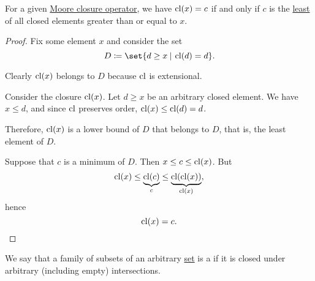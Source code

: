 \begin{proposition}\label{thm:closure_operator_minimality}
  For a given \hyperref[def:moore_closure_operator]{Moore closure operator}, we have \( \operatorname{cl}(x) = c \) if and only if \( c \) is the \hyperref[def:extremal_points/maximum_and_minimum]{least} of all closed elements greater than or equal to \( x \).
\end{proposition}
\begin{proof}
  Fix some element \( x \) and consider the set
  \begin{equation*}
    D \coloneqq \set{ d \geq x \given \cl(d) = d }.
  \end{equation*}

  Clearly \( \operatorname{cl}(x) \) belongs to \( D \) because \( \operatorname{cl} \) is extensional.

  \SufficiencySubProof Consider the closure \( \operatorname{cl}(x) \). Let \( d \geq x \) be an arbitrary closed element. We have \( x \leq d \), and since \( \operatorname{cl} \) preserves order, \( \operatorname{cl}(x) \leq \operatorname{cl}(d) = d \).

  Therefore, \( \operatorname{cl}(x) \) is a lower bound of \( D \) that belongs to \( D \), that is, the least element of \( D \).

  \NecessitySubProof Suppose that \( c \) is a minimum of \( D \). Then \( x \leq c \leq \operatorname{cl}(x) \). But
  \begin{equation*}
    \operatorname{cl}(x) \leq \underbrace{\operatorname{cl}(c)}_{c} \leq \underbrace{\operatorname{cl}(\operatorname{cl}(x))}_{\operatorname{cl}(x)},
  \end{equation*}
  hence
  \begin{equation*}
    \operatorname{cl}(x) = c.
  \end{equation*}
\end{proof}

\begin{definition}\label{def:moore_family}
  We say that a family of subsets of an arbitrary \hyperref[def:set]{set} is a  if it is closed under arbitrary (including empty) intersections.
\end{definition}

